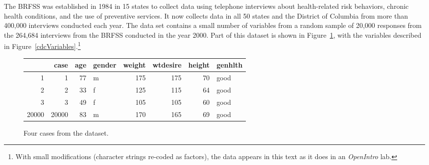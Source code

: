{%



The BRFSS was established in 1984 in 15 states to collect data using telephone interviews about health-related risk behaviors, chronic health conditions, and the use of preventive services.  It now collects data in all 50 states and the District of Columbia from more than 400,000 interviews conducted each year.  The data set  contains a small number of variables from a random sample of 20,000 responses from the 264,684 interviews from the BRFSS conducted in the year 2000.  Part of this dataset is shown in Figure~\ref{cdcDF}, with the variables described in Figure~\ref{cdcVariables}.\footnote{With small modifications (character strings re-coded as factors), the data appears in this text as it does in an \textit{OpenIntro} lab. }

\begin{figure}[ht]
\centering
\begin{tabular}{rrrlrrrl}
  \hline
 & case & age & gender & weight & wtdesire & height & genhlth \\ 
  \hline
1 &   1 &  77 & m & 175 & 175 &  70 & good \\ 
  2 &   2 &  33 & f & 125 & 115 &  64 & good \\ 
  3 &   3 &  49 & f & 105 & 105 &  60 & good \\ 
  20000 & 20000 &  83 & m & 170 & 165 &  69 & good \\ 
   \hline
\end{tabular}
\caption{Four cases from the  dataset.}
\label{cdcDF}
\end{figure}

}
